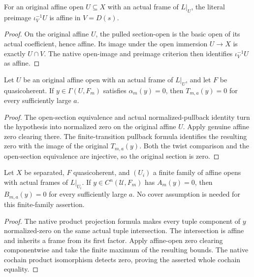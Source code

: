 \begin{lemma}
\label{lem:cech-line-native-affine-section-preimage}
\leanok
For an original affine open $U\subseteq X$ with an actual frame of
$L|_U$, the literal preimage $\iota_V^{-1}U$ is affine in $V=D(s)$.
\end{lemma}
\begin{proof}
On the original affine $U$, the pulled section-open is the basic open
of its actual coefficient, hence affine. Its image under the open
immersion $U\to X$ is exactly $U\cap V$. The native open-image and
preimage criterion then identifies $\iota_V^{-1}U$ as affine.
\end{proof}

\begin{lemma}
\label{lem:cech-line-native-affine-open-zero}
\leanok
Let $U$ be an original affine open with an actual frame of $L|_U$,
and let $F$ be quasicoherent. If $y\in\Gamma(U,F_m)$ satisfies
$\alpha_m(y)=0$, then $T_{m,a}(y)=0$ for every sufficiently large $a$.
\end{lemma}
\begin{proof}
The open-section equivalence and actual normalized-pullback identity
turn the hypothesis into normalized zero on the original affine $U$.
Apply genuine affine zero clearing there. The finite-transition
pullback formula identifies the resulting zero with the image of the
original $T_{m,a}(y)$. Both the twist comparison and the open-section
equivalence are injective, so the original section is zero.
\end{proof}

\begin{lemma}
\label{lem:cech-line-native-finite-cochain-zero}
\leanok
Let $X$ be separated, $F$ quasicoherent, and $(U_i)$ a finite family
of affine opens with actual frames of $L|_{U_i}$. If
$y\in C^n(\mathcal U,F_m)$ has $A_m(y)=0$, then
$B_{m,a}(y)=0$ for every sufficiently large $a$.
No cover assumption is needed for this finite-family assertion.
\end{lemma}
\begin{proof}
The native product projection formula makes every tuple component of
$y$ normalized-zero on the same actual tuple intersection. The
intersection is affine and inherits a frame from its first factor.
Apply affine-open zero clearing componentwise and take the finite
maximum of the resulting bounds. The native cochain product
isomorphism detects zero, proving the asserted whole cochain equality.
\end{proof}

